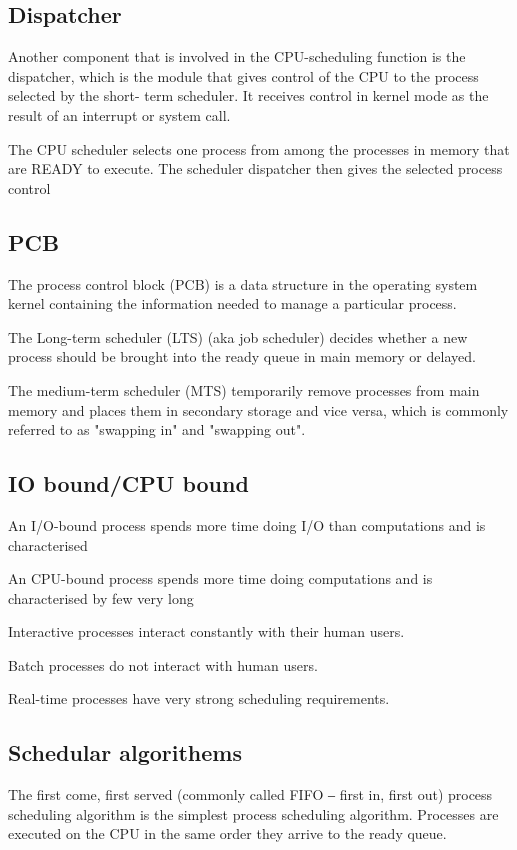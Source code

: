 \subsection{Dispatcher}
Another component that is involved in the
CPU-scheduling function is the dispatcher,
which is the module that gives control of the
CPU to the process selected by the short-
term scheduler. It receives control in kernel
mode as the result of an interrupt or system
call.  \newline

The CPU scheduler selects one process from among the
processes in memory that are READY to execute. The
scheduler dispatcher then gives the selected process control

\subsection{PCB}
The process control block (PCB) is a data
structure in the operating system kernel
containing the information needed to
manage a particular process. \newline

The Long-term scheduler (LTS) (aka job
scheduler) decides whether a new process should
be brought into the ready queue in main memory
or delayed. \newline

The medium-term scheduler (MTS) temporarily remove processes from
main memory and places them in secondary storage and vice versa,
which is commonly referred to as "swapping in" and "swapping out".

\subsection{IO bound/CPU bound}
An I/O-bound process spends
more time doing I/O than
computations and is characterised \newline

An CPU-bound process spends
more time doing computations and
is characterised by few very long

Interactive processes interact constantly with their human
users.  \newline

Batch processes do not interact with human users. \newline

Real-time processes have very strong scheduling
requirements.

\subsection{Schedular algorithems}
The first come, first served (commonly called FIFO ‒ first
in, first out) process scheduling algorithm is the simplest
process scheduling algorithm. Processes are executed on
the CPU in the same order they arrive to the ready queue. \newline


